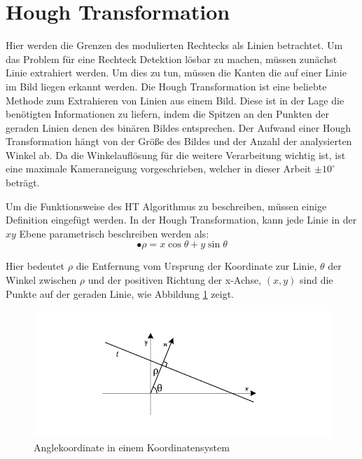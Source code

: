 \section{Hough Transformation}

Hier werden die Grenzen des modulierten Rechtecks als Linien betrachtet. Um das Problem für eine Rechteck Detektion lösbar zu machen, müssen zunächst Linie extrahiert werden. Um dies zu tun, müssen die Kanten die auf einer Linie im Bild liegen erkannt werden. Die Hough Transformation ist eine beliebte Methode zum Extrahieren von Linien aus einem Bild. Diese ist in der Lage die benötigten Informationen zu liefern, indem die Spitzen an den Punkten der geraden Linien denen des binären Bildes entsprechen. Der Aufwand einer Hough Transformation hängt von der Größe des Bildes und der Anzahl der analysierten Winkel ab. Da die Winkelauflösung für die weitere Verarbeitung wichtig ist, ist eine maximale Kameraneigung vorgeschrieben, welcher in dieser Arbeit $ \pm 10^{\circ} $ beträgt.

Um die Funktionsweise des HT Algorithmus zu beschreiben, müssen einige Definition eingefügt werden. In der Hough Transformation, kann jede Linie in der $ xy $ Ebene parametrisch beschreiben werden als:
\begin{equation}
•  \rho = x \cos \theta + y \sin \theta
 \label{gl:Anglekoordinate}
\end{equation} 

Hier bedeutet $ \rho $ die Entfernung vom Ursprung der Koordinate zur Linie, $ \theta $ der Winkel zwischen $ \rho $ und der positiven Richtung der x-Achse, $ (x,y) $ sind die Punkte auf der geraden Linie, wie Abbildung \ref{fig:Hough} zeigt.

\begin{figure}[H]
 \centering 
  \includegraphics[keepaspectratio,width=1.0\textwidth]{images/4_ZweiteErfahrung/Hough/Hough.pdf}
 \caption{Anglekoordinate in einem Koordinatensystem}
 \label{fig:Hough}
\end{figure}

